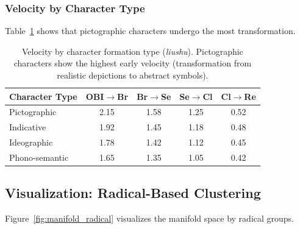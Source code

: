 \documentclass{article}
\newcommand{\cg}[1]{\begin{CJK*}{UTF8}{gbsn}#1\end{CJK*}}
\begin{document}
\subsubsection{Velocity by Character Type}

Table~\ref{tab:velocity_char_type} shows that pictographic characters undergo the most transformation.

\begin{table}[h]
\centering
\caption{Velocity by character formation type (\textit{liushu}). Pictographic characters show the highest early velocity (transformation from realistic depictions to abstract symbols).}
\label{tab:velocity_char_type}
\begin{tabular}{lcccc}
\toprule
\textbf{Character Type} & \textbf{OBI$\to$Br} & \textbf{Br$\to$Se} & \textbf{Se$\to$Cl} & \textbf{Cl$\to$Re} \\
\midrule
Pictographic & 2.15 & 1.58 & 1.25 & 0.52 \\
Indicative & 1.92 & 1.45 & 1.18 & 0.48 \\
Ideographic & 1.78 & 1.42 & 1.12 & 0.45 \\
Phono-semantic & 1.65 & 1.35 & 1.05 & 0.42 \\
\bottomrule
\end{tabular}
\end{table}

\subsection{Visualization: Radical-Based Clustering}

Figure~\ref{fig:manifold_radical} visualizes the manifold space by radical groups. %


\end{document}
